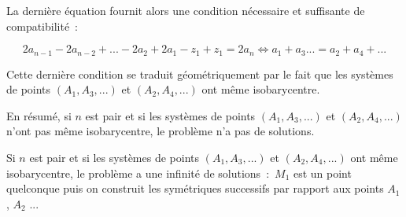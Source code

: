 {{La dernière équation fournit alors une condition nécessaire et suffisante de compatibilité~:

$$2a_{n-1}-2a_{n-2}+...-2a_2+2a_1-z_1+z_1=2a_n\Leftrightarrow a_1+a_3...=a_2+a_4+...$$

Cette dernière condition se traduit géométriquement par le fait que les systèmes de points $(A_1,A_3,...)$ et
$(A_2,A_4,...)$ ont même isobarycentre.

En résumé, si $n$ est pair et si les systèmes de points $(A_1,A_3,...)$ et $(A_2,A_4,...)$ n'ont pas même isobarycentre, le problème n'a pas de solutions.

Si $n$ est pair et si les systèmes de points $(A_1,A_3,...)$ et $(A_2,A_4,...)$ ont même isobarycentre, le problème a une infinité de solutions~:~$M_1$ est un point quelconque puis on construit les symétriques successifs par rapport aux points $A_1$, $A_2$ ...
}
}

